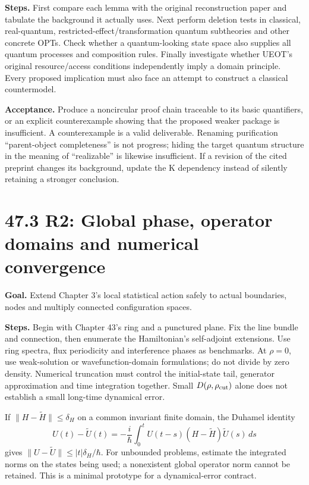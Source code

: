\documentclass[
  11pt,
  oneside]{book}
\begin{document}
\textbf{Steps.} First compare each lemma with the original
reconstruction paper and tabulate the background it actually uses. Next
perform deletion tests in classical, real-quantum,
restricted-effect/transformation quantum subtheories and other concrete
OPTs. Check whether a quantum-looking state space also supplies all
quantum processes and composition rules. Finally investigate whether
UEOT's original resource/access conditions independently imply a domain
principle. Every proposed implication must also face an attempt to
construct a classical countermodel.

\textbf{Acceptance.} Produce a noncircular proof chain traceable to its
basic quantifiers, or an explicit counterexample showing that the
proposed weaker package is insufficient. A counterexample is a valid
deliverable. Renaming purification ``parent-object completeness'' is not
progress; hiding the target quantum structure in the meaning of
``realizable'' is likewise insufficient. If a revision of the cited
preprint changes its background, update the K dependency instead of
silently retaining a stronger conclusion.

\section{47.3 R2: Global phase, operator domains and numerical
convergence}

\textbf{Goal.} Extend Chapter 3's local statistical action safely to
actual boundaries, nodes and multiply connected configuration spaces.

\textbf{Steps.} Begin with Chapter 43's ring and a punctured plane. Fix
the line bundle and connection, then enumerate the Hamiltonian's
self-adjoint extensions. Use ring spectra, flux periodicity and
interference phases as benchmarks. At \(\rho=0\), use weak-solution or
wavefunction-domain formulations; do not divide by zero density.
Numerical truncation must control the initial-state tail, generator
approximation and time integration together. Small
\(D(\rho,\rho_{\rm cut})\) alone does not establish a small long-time
dynamical error.

If \(\|H-\widetilde H\|\le\delta_H\) on a common invariant finite
domain, the Duhamel identity \[
U(t)-\widetilde U(t)
=-\frac{i}{\hbar}\int_0^tU(t-s)(H-\widetilde H)\widetilde U(s)\,ds
\] gives \(\|U-\widetilde U\|\le |t|\delta_H/\hbar\). For unbounded
problems, estimate the integrated norms on the states being used; a
nonexistent global operator norm cannot be retained. This is a minimal
prototype for a dynamical-error contract.
\end{document}

